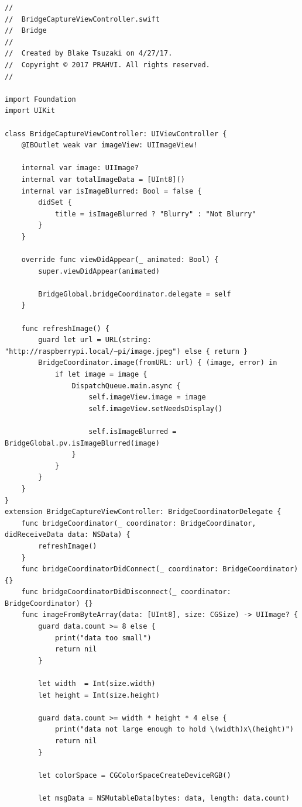 \begin{lstlisting}
//
//  BridgeCaptureViewController.swift
//  Bridge
//
//  Created by Blake Tsuzaki on 4/27/17.
//  Copyright © 2017 PRAHVI. All rights reserved.
//

import Foundation
import UIKit

class BridgeCaptureViewController: UIViewController {
    @IBOutlet weak var imageView: UIImageView!
    
    internal var image: UIImage?
    internal var totalImageData = [UInt8]()
    internal var isImageBlurred: Bool = false {
        didSet {
            title = isImageBlurred ? "Blurry" : "Not Blurry"
        }
    }
    
    override func viewDidAppear(_ animated: Bool) {
        super.viewDidAppear(animated)
        
        BridgeGlobal.bridgeCoordinator.delegate = self
    }
    
    func refreshImage() {
        guard let url = URL(string: "http://raspberrypi.local/~pi/image.jpeg") else { return }
        BridgeCoordinator.image(fromURL: url) { (image, error) in
            if let image = image {
                DispatchQueue.main.async {
                    self.imageView.image = image
                    self.imageView.setNeedsDisplay()
                    
                    self.isImageBlurred = BridgeGlobal.pv.isImageBlurred(image)
                }
            }
        }
    }
}
extension BridgeCaptureViewController: BridgeCoordinatorDelegate {
    func bridgeCoordinator(_ coordinator: BridgeCoordinator, didReceiveData data: NSData) {
        refreshImage()
    }
    func bridgeCoordinatorDidConnect(_ coordinator: BridgeCoordinator) {}
    func bridgeCoordinatorDidDisconnect(_ coordinator: BridgeCoordinator) {}
    func imageFromByteArray(data: [UInt8], size: CGSize) -> UIImage? {
        guard data.count >= 8 else {
            print("data too small")
            return nil
        }
        
        let width  = Int(size.width)
        let height = Int(size.height)
        
        guard data.count >= width * height * 4 else {
            print("data not large enough to hold \(width)x\(height)")
            return nil
        }
        
        let colorSpace = CGColorSpaceCreateDeviceRGB()
        
        let msgData = NSMutableData(bytes: data, length: data.count)
        

\end{lstlisting}
